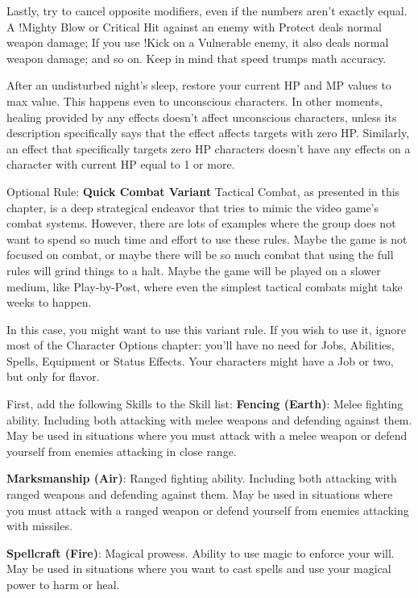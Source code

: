 Lastly, try to cancel opposite modifiers,
even if the numbers aren't exactly equal.
A !Mighty Blow or Critical Hit against an enemy
with Protect deals normal weapon damage; If you
use !Kick on a Vulnerable enemy, it also deals
normal weapon damage; and so on. Keep in mind
that speed trumps math accuracy.

After an undisturbed night's sleep, restore
your current HP and MP values to max value. This
happens even to unconscious characters. In other
moments, healing provided by any effects doesn’t
affect unconscious characters, unless its
description specifically says that the effect affects
targets with zero HP. Similarly, an effect that
specifically targets zero HP characters doesn’t
have any effects on a character with current HP
equal to 1 or more.

Optional Rule: \textbf{Quick Combat Variant}
Tactical Combat, as presented in this
chapter, is a deep strategical endeavor that tries
to mimic the video game's combat systems.
However, there are lots of examples where the
group does not want to spend so much time and
effort to use these rules. Maybe the game is not
focused on combat, or maybe there will be so
much combat that using the full rules will grind
things to a halt. Maybe the game will be played
on a slower medium, like Play-by-Post, where
even the simplest tactical combats might take
weeks to happen.

In this case, you might want to use this
variant rule. If you wish to use it, ignore most of
the Character Options chapter: you'll have no
need for Jobs, Abilities, Spells, Equipment or
Status Effects. Your characters might have a Job
or two, but only for flavor.

First, add the following Skills to the Skill
list:
\textbf{Fencing (Earth)}: Melee fighting ability.
Including both attacking with melee weapons
and defending against them. May be used in
situations where you must attack with a melee
weapon or defend yourself from enemies
attacking in close range.

\textbf{Marksmanship (Air)}: Ranged fighting
ability. Including both attacking with ranged
weapons and defending against them. May be
used in situations where you must attack with a
ranged weapon or defend yourself from enemies
attacking with missiles.

\textbf{Spellcraft (Fire)}: Magical prowess. Ability
to use magic to enforce your will. May be used in
situations where you want to cast spells and use
your magical power to harm or heal.

